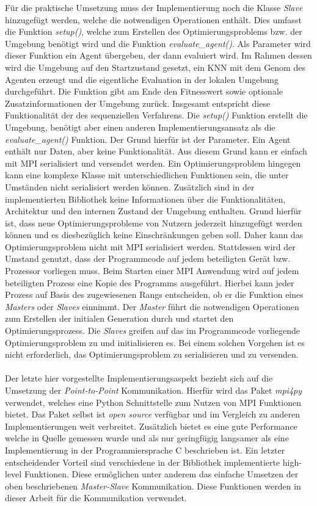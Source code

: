 Für die praktische Umsetzung muss der Implementierung noch die Klasse \emph{Slave} hinzugefügt werden, welche die notwendigen Operationen enthält. Dies umfasst die Funktion \emph{setup()}, welche zum Erstellen des Optimierungsproblems bzw. der Umgebung benötigt wird und die Funktion \emph{evaluate\_agent()}. Als Parameter wird dieser Funktion ein Agent übergeben, der dann evaluiert wird. Im Rahmen dessen wird die Umgebung auf den Startzustand gesetzt, ein \ac{KNN} mit dem Genom des Agenten erzeugt und die eigentliche Evaluation in der lokalen Umgebung durchgeführt. Die Funktion gibt am Ende den Fitnesswert sowie optionale Zusatzinformationen der Umgebung zurück. Insgesamt entspricht diese Funktionalität der des sequenziellen Verfahrens. Die \emph{setup()} Funktion erstellt die Umgebung, benötigt aber einen anderen Implementierungsansatz als die \emph{evaluate\_agent()} Funktion. Der Grund hierfür ist der Parameter. Ein Agent enthält nur Daten, aber keine Funktionalität. Aus diesem Grund kann er einfach mit \ac{MPI} serialisiert und versendet werden. Ein Optimierungsproblem hingegen kann eine komplexe Klasse mit unterschiedlichen Funktionen sein, die unter Umständen nicht serialisiert werden können. Zusätzlich sind in der implementierten Bibliothek keine Informationen über die Funktionalitäten, Architektur und den internen Zustand der Umgebung enthalten. Grund hierfür ist, dass neue Optimierungsprobleme von Nutzern jederzeit hinzugefügt werden können und es diesbezüglich keine Einschränkungen geben soll. Daher kann das Optimierungsproblem nicht mit \ac{MPI} serialisiert werden. Stattdessen wird der Umstand genutzt, dass der Programmcode auf jedem beteiligten Gerät bzw. Prozessor vorliegen muss. Beim Starten einer \ac{MPI} Anwendung wird auf jedem beteiligten Prozess eine Kopie des Programms ausgeführt. Hierbei kann jeder Prozess auf Basis des zugewiesenen Rangs entscheiden, ob er die Funktion eines \emph{Masters} oder \emph{Slaves} einnimmt. Der \emph{Master} führt die notwendigen Operationen zum Erstellen der initialen Generation durch und startet den Optimierungsprozess. Die \emph{Slaves} greifen auf das im Programmcode vorliegende Optimierungsproblem zu und initialisieren es. Bei einem solchen Vorgehen ist es nicht erforderlich, das Optimierungsproblem zu serialisieren und zu versenden.
\\\\
Der letzte hier vorgestellte Implementierungsaspekt bezieht sich auf die Umsetzung der \emph{Point-to-Point} Kommunikation. Hierfür wird das Paket \emph{mpi4py} verwendet, welches eine Python Schnittstelle zum Nutzen von \ac{MPI} Funktionen bietet. Das Paket selbst ist \emph{open source} verfügbar und im Vergleich zu anderen Implementierungen weit verbreitet. Zusätzlich bietet es eine gute Performance welche in Quelle \cite{dalcin2008mpi} gemessen wurde und als nur geringfügig langsamer als eine Implementierung in der Programmiersprache C beschrieben ist. Ein letzter entscheidender Vorteil sind verschiedene in der Bibliothek implementierte high-level Funktionen. Diese ermöglichen unter anderem das einfache Umsetzen der oben beschriebenen \emph{Master-Slave} Kommunikation. Diese Funktionen werden in dieser Arbeit für die Kommunikation verwendet.
